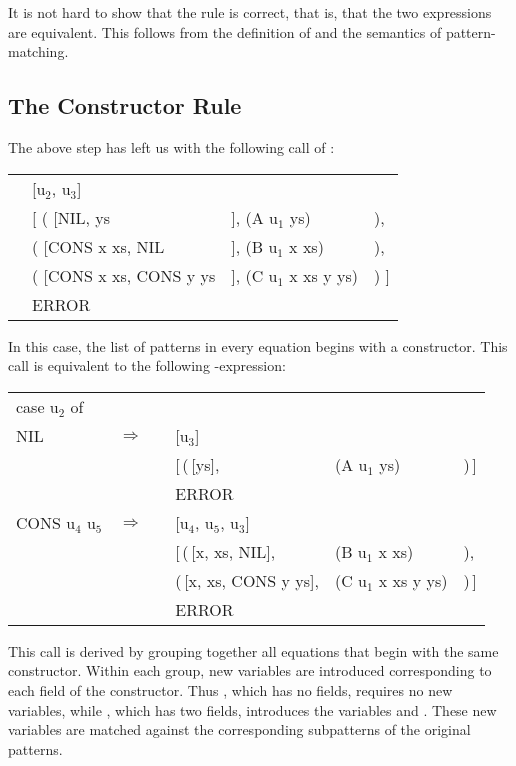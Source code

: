 It is not hard to show that the rule is correct, that is, that the two  expressions are equivalent. This follows from the definition of  and the semantics of pattern-matching.

\subsection{The Constructor Rule}
The above step has left us with the following call of :
\begin{mlcoded}
    \setlength{\tabcolsep}{0.25em}
    \begin{tabular}{llll}
        \metafn{match} &[u$_2$, u$_3$]  && \\
    &[ ( [NIL, ys&], (A u$_1$ ys) &), \\
    &\phantom{[ }( [CONS x xs, NIL&], (B u$_1$ x xs) &), \\
    &\phantom{[ }( [CONS x xs, CONS y ys&], (C u$_1$ x xs y ys) &) ] \\
    &ERROR
    \end{tabular}
\end{mlcoded}
In this case, the list of patterns in every equation begins with a constructor. This call is equivalent to the following -expression:
\begin{mlcoded}
    \setlength{\tabcolsep}{0.25em}
    \begin{tabular}{llllll}
        case u$_2$ of &&&&& \\
    \quad NIL &$\Rightarrow$ &\metafn{match} &[u$_3$] && \\
    &&&[\,(\,[ys], &(A u$_1$ ys) &)\,] \\
    &&&ERROR &&\\
    \quad CONS\! u$_4$\! u$_5$ &$\Rightarrow$ &\metafn{match} &[u$_4$, u$_5$, u$_3$] &&\\
    &&&[\,(\,[x, xs, NIL], &(B u$_1$ x xs) &), \\
    &&&\phantom{[\,}(\,[x, xs, CONS y ys], &(C u$_1$ x xs y ys) &)\,] \\
    &&&ERROR
    \end{tabular}
\end{mlcoded}
This call is derived by grouping together all equations that begin with the same constructor. Within each group, new variables are introduced corresponding to each field of the constructor. Thus , which has no fields, requires no new variables, while , which has two fields, introduces the variables  and . These new variables are matched against the corresponding subpatterns of the original patterns.

